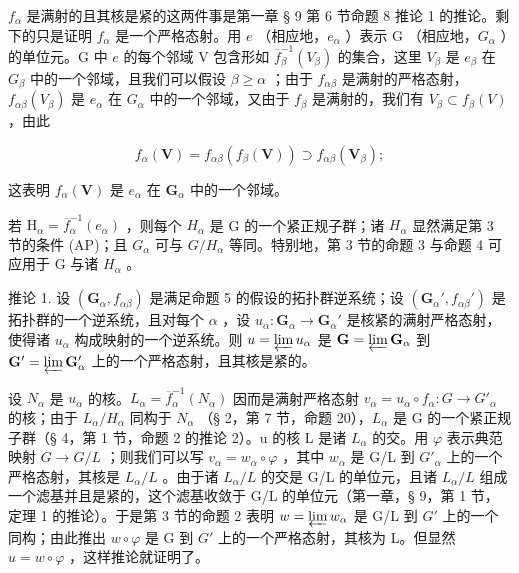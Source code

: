 \(f_{\alpha}\) 是满射的且其核是紧的这两件事是第一章 § 9 第 6 节命题 8 推论 1 的推论。剩下的只是证明 \(f_{\alpha}\) 是一个严格态射。用 \(e\) （相应地，\(e_{\alpha}\) ）表示 G （相应地，\(G_{\alpha}\) ）的单位元。G 中 \(e\) 的每个邻域 V 包含形如 \(\overline{f}_{\beta}^{-1}(V_{\beta})\) 的集合，这里 \(V_{\beta}\) 是 \(e_{\beta}\) 在 \(G_{\beta}\) 中的一个邻域，且我们可以假设 \(\beta \geqslant \alpha\) ；由于 \(f_{\alpha \beta}\) 是满射的严格态射，\(f_{\alpha \beta}(V_{\beta})\) 是 \(e_{\alpha}\) 在 \(G_{\alpha}\) 中的一个邻域，又由于 \(f_{\beta}\) 是满射的，我们有 \(V_{\beta} \subset f_{\beta}(V)\) ，由此

\[
f _ {\alpha} (\mathbf {V}) = f _ {\alpha \beta} (f _ {\beta} (\mathbf {V})) \supset f _ {\alpha \beta} (\mathbf {V} _ {\beta});
\]

这表明 \(f_{\alpha}(\mathbf{V})\) 是 \(e_{\alpha}\) 在 \(\mathbf{G}_{\alpha}\) 中的一个邻域。

若 \(\mathrm{H}_{\alpha}=\overline{f}_{\alpha}^{-1}(e_{\alpha})\) ，则每个 \(H_{\alpha}\) 是 G 的一个紧正规子群；诸 \(H_{\alpha}\) 显然满足第 3 节的条件 (AP)；且 \(G_{\alpha}\) 可与 \(G/H_{\alpha}\) 等同。特别地，第 3 节的命题 3 与命题 4 可应用于 G 与诸 \(H_{\alpha}\) 。

推论 1. 设 \((\mathbf{G}_{\alpha}, f_{\alpha \beta})\) 是满足命题 5 的假设的拓扑群逆系统；设 \((\mathbf{G}_{\alpha}', f_{\alpha \beta}')\) 是拓扑群的一个逆系统，且对每个 \(\alpha\) ，设 \(u_{\alpha}: \mathbf{G}_{\alpha} \to \mathbf{G}_{\alpha}'\) 是核紧的满射严格态射，使得诸 \(u_{\alpha}\) 构成映射的一个逆系统。则 \(u = \varprojlim u_{\alpha}\) 是 \(\mathbf{G} = \varprojlim \mathbf{G}_{\alpha}\) 到 \(\mathbf{G}' = \varprojlim \mathbf{G}_{\alpha}'\) 上的一个严格态射，且其核是紧的。

设 \(N_{\alpha}\) 是 \(u_{\alpha}\) 的核。\(L_{\alpha} = \overline{f}_{\alpha}^{-1}(N_{\alpha})\) 因而是满射严格态射 \(v_{\alpha} = u_{\alpha} \circ f_{\alpha}: G \to G'_{\alpha}\) 的核；由于 \(L_{\alpha}/H_{\alpha}\) 同构于 \(N_{\alpha}\) （§ 2，第 7 节，命题 20），\(L_{\alpha}\) 是 G 的一个紧正规子群（§ 4，第 1 节，命题 2 的推论 2）。u 的核 L 是诸 \(L_{\alpha}\) 的交。用 \(\varphi\) 表示典范映射 \(G \to G/L\) ；则我们可以写 \(v_{\alpha} = w_{\alpha} \circ \varphi\) ，其中 \(w_{\alpha}\) 是 G/L 到 \(G'_{\alpha}\) 上的一个严格态射，其核是 \(L_{\alpha}/L\) 。由于诸 \(L_{\alpha}/L\) 的交是 G/L 的单位元，且诸 \(L_{\alpha}/L\) 组成一个滤基并且是紧的，这个滤基收敛于 G/L 的单位元（第一章，§ 9，第 1 节，定理 1 的推论）。于是第 3 节的命题 2 表明 \(w = \varprojlim w_{\alpha}\) 是 G/L 到 \(G'\) 上的一个同构；由此推出 \(w \circ \varphi\) 是 G 到 \(G'\) 上的一个严格态射，其核为 L。但显然 \(u = w \circ \varphi\) ，这样推论就证明了。

